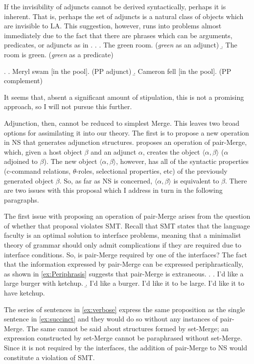 \documentclass[MilwayThesis]{subfiles}
\begin{document}
If the invisibility of adjuncts cannot be derived syntactically, perhaps it is inherent.
That is, perhaps the set of adjuncts is a natural class of objects which are invisible to LA.
This suggestion, however, runs into problems almost immediately due to the fact that there are phrases which can be arguments, predicates, or adjuncts as in .
\ex. \label{ex:Adjective}
\a. The green room. (\textit{green} as an adjunct)
\b. The room is green. (\textit{green} as a predicate)

\ex. \label{ex:PP} 
\a. Meryl swam [in the pool]. (PP adjunct)
\b. Cameron fell [in the pool]. (PP complement)

It seems that, absent a significant amount of stipulation, this is not a promising approach, so I will not pursue this further.

Adjunction, then, cannot be reduced to simplest Merge.
This leaves two broad options for assimilating it into our theory.
The first is to propose a new operation in NS that generates adjunction structures.
\textcite{chomsky2004beyond} proposes an operation of pair-Merge, which, given a host object $\beta$ and an adjunct $\alpha$, creates the object $\langle\alpha,\beta\rangle$ ($\alpha$ adjoined to $\beta$).
The new object $\langle\alpha,\beta\rangle$, however, has all of the syntactic properties (c-command relations, $\theta$-roles, selectional properties, etc) of the previously generated object $\beta$.
So, as far as NS is concerned, $\langle\alpha,\beta\rangle$ is equivalent to $\beta$.
There are two issues with this proposal which I address in turn in the following paragraphs.

The first issue with proposing an operation of pair-Merge arises from the question of whether that proposal violates SMT.
Recall that SMT states that the language faculty is an optimal solution to interface problems, meaning that a minimalist theory of grammar should only admit complications if they are required due to interface conditions.
So, is pair-Merge required by one of the interfaces?
The fact that the information expressed by pair-Merge can be expressed periphrastically, as shown in \cref{ex:Periphrasis} suggests that pair-Merge is extraneous.
\ex.\label{ex:Periphrasis}
\a. I'd like a large burger with ketchup.\label{ex:succinct}
\b. I'd like a burger. I'd like it to be large. I'd like it to have ketchup.\label{ex:verbose}

The series of sentences in \cref{ex:verbose} express the same proposition as the single sentence in \cref{ex:succinct} and they would do so without any instances of pair-Merge.
The same cannot be said about structures formed by set-Merge; an expression constructed by set-Merge cannot be paraphrased without set-Merge.
Since it is not required by the interfaces, the addition of pair-Merge to NS would constitute a violation of SMT.
\end{document}
